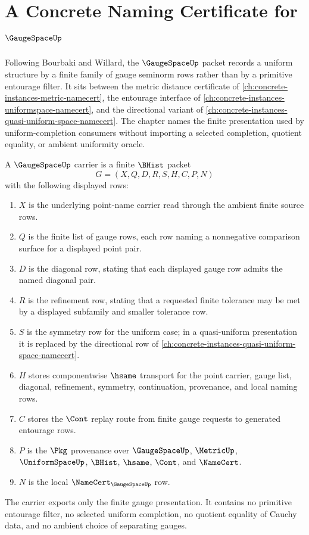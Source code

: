 \chapter{A Concrete Naming Certificate for $\GaugeSpaceUp$}
\label{ch:concrete-instances-gauge-space-namecert}

Following Bourbaki and Willard, the $\GaugeSpaceUp$ packet records a uniform structure by a finite family of gauge seminorm rows rather than by a primitive entourage filter. It sits between the metric distance certificate of \autoref{ch:concrete-instances-metric-namecert}, the entourage interface of \autoref{ch:concrete-instances-uniformspace-namecert}, and the directional variant of \autoref{ch:concrete-instances-quasi-uniform-space-namecert}. The chapter names the finite presentation used by uniform-completion consumers without importing a selected completion, quotient equality, or ambient uniformity oracle.

\begin{definition}
\label{def:gauge-space-carrier}
A $\GaugeSpaceUp$ carrier is a finite $\BHist$ packet
$$
G=(X,Q,D,R,S,H,C,P,N)
$$
with the following displayed rows:
\begin{enumerate}
\item $X$ is the underlying point-name carrier read through the ambient finite source rows.
\item $Q$ is the finite list of gauge rows, each row naming a nonnegative comparison surface for a displayed point pair.
\item $D$ is the diagonal row, stating that each displayed gauge row admits the named diagonal pair.
\item $R$ is the refinement row, stating that a requested finite tolerance may be met by a displayed subfamily and smaller tolerance row.
\item $S$ is the symmetry row for the uniform case; in a quasi-uniform presentation it is replaced by the directional row of \autoref{ch:concrete-instances-quasi-uniform-space-namecert}.
\item $H$ stores componentwise $\hsame$ transport for the point carrier, gauge list, diagonal, refinement, symmetry, continuation, provenance, and local naming rows.
\item $C$ stores the $\Cont$ replay route from finite gauge requests to generated entourage rows.
\item $P$ is the $\Pkg$ provenance over $\GaugeSpaceUp$, $\MetricUp$, $\UniformSpaceUp$, $\BHist$, $\hsame$, $\Cont$, and $\NameCert$.
\item $N$ is the local $\NameCert_{\GaugeSpaceUp}$ row.
\end{enumerate}
The carrier exports only the finite gauge presentation. It contains no primitive entourage filter, no selected uniform completion, no quotient equality of Cauchy data, and no ambient choice of separating gauges.
\end{definition}

